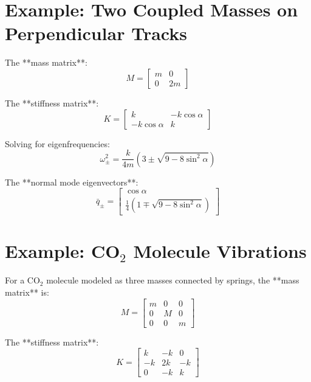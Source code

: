 \documentclass{article}
\begin{document}
\section{Example: Two Coupled Masses on Perpendicular Tracks}
The **mass matrix**:
\begin{equation}
M = \begin{bmatrix} m & 0 \\ 0 & 2m \end{bmatrix}
\end{equation}

The **stiffness matrix**:
\begin{equation}
K = \begin{bmatrix} k & -k \cos\alpha \\ -k \cos\alpha & k \end{bmatrix}
\end{equation}

Solving for eigenfrequencies:
\begin{equation}
\omega^2_{\pm} = \frac{k}{4m} \left(3 \pm \sqrt{9 - 8 \sin^2 \alpha} \right)
\end{equation}

The **normal mode eigenvectors**:
\begin{equation}
\bar{q}_\pm = \begin{bmatrix} \cos\alpha \\ \frac{1}{4} (1 \mp \sqrt{9 - 8 \sin^2 \alpha}) \end{bmatrix}
\end{equation}

\section{Example: CO$_2$ Molecule Vibrations}
For a CO$_2$ molecule modeled as three masses connected by springs, the **mass matrix** is:
\begin{equation}
M = \begin{bmatrix} m & 0 & 0 \\ 0 & M & 0 \\ 0 & 0 & m \end{bmatrix}
\end{equation}

The **stiffness matrix**:
\begin{equation}
K = \begin{bmatrix} k & -k & 0 \\ -k & 2k & -k \\ 0 & -k & k \end{bmatrix}
\end{equation}
\end{document}
